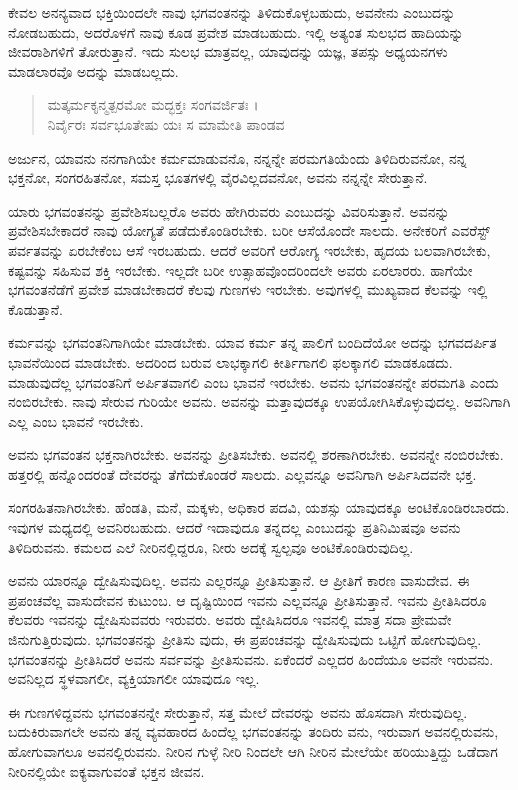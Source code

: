 ಕೇವಲ ಅನನ್ಯವಾದ ಭಕ್ತಿಯಿಂದಲೇ ನಾವು ಭಗವಂತನನ್ನು ತಿಳಿದುಕೊಳ್ಳಬಹುದು, ಅವನೇನು ಎಂಬುದನ್ನು ನೋಡಬಹುದು, ಅದರೊಳಗೆ ನಾವು ಕೂಡ ಪ್ರವೇಶ ಮಾಡಬಹುದು. ಇಲ್ಲಿ ಅತ್ಯಂತ ಸುಲಭದ ಹಾದಿಯನ್ನು ಜೀವರಾಶಿಗಳಿಗೆ ತೋರುತ್ತಾನೆ. ಇದು ಸುಲಭ ಮಾತ್ರವಲ್ಲ, ಯಾವುದನ್ನು ಯಜ್ಞ, ತಪಸ್ಸು ಅಧ್ಯಯನಗಳು ಮಾಡಲಾರವೊ ಅದನ್ನು ಮಾಡಬಲ್ಲದು.

\begin{verse}
ಮತ್ಕರ್ಮಕೃನ್ಮತ್ಪರಮೋ ಮದ್ಭಕ್ತಃ ಸಂಗವರ್ಜಿತಃ ।\\ನಿರ್ವೈರಃ ಸರ್ವಭೂತೇಷು ಯಃ ಸ ಮಾಮೇತಿ ಪಾಂಡವ 
\end{verse}

{\small ಅರ್ಜುನ, ಯಾವನು ನನಗಾಗಿಯೇ ಕರ್ಮಮಾಡುವನೊ, ನನ್ನನ್ನೇ ಪರಮಗತಿಯೆಂದು ತಿಳಿದಿರುವನೋ, ನನ್ನ ಭಕ್ತನೋ, ಸಂಗರಹಿತನೋ, ಸಮಸ್ತ ಭೂತಗಳಲ್ಲಿ ವೈರವಿಲ್ಲದವನೋ, ಅವನು ನನ್ನನ್ನೇ ಸೇರುತ್ತಾನೆ.}

ಯಾರು ಭಗವಂತನನ್ನು ಪ್ರವೇಶಿಸಬಲ್ಲರೊ ಅವರು ಹೇಗಿರುವರು ಎಂಬುದನ್ನು ವಿವರಿಸುತ್ತಾನೆ. ಅವನನ್ನು ಪ್ರವೇಶಿಸಬೇಕಾದರೆ ನಾವು ಯೋಗ್ಯತೆ ಪಡೆದುಕೊಂಡಿರಬೇಕು. ಬರೀ ಆಸೆಯೊಂದೇ ಸಾಲದು. ಅನೇಕರಿಗೆ ಎವರೆಸ್ಟ್ ಪರ್ವತವನ್ನು ಏರಬೇಕೆಂಬ ಆಸೆ ಇರಬಹುದು. ಆದರೆ ಅವರಿಗೆ ಆರೋಗ್ಯ ಇರಬೇಕು, ಹೃದಯ ಬಲವಾಗಿರಬೇಕು, ಕಷ್ಟವನ್ನು ಸಹಿಸುವ ಶಕ್ತಿ ಇರಬೇಕು. ಇಲ್ಲದೇ ಬರೀ ಉತ್ಸಾಹವೊಂದರಿಂದಲೇ ಅವರು ಏರಲಾರರು. ಹಾಗೆಯೇ ಭಗವಂತನೆಡೆಗೆ ಪ್ರವೇಶ ಮಾಡಬೇಕಾದರೆ ಕೆಲವು ಗುಣಗಳು ಇರಬೇಕು. ಅವುಗಳಲ್ಲಿ ಮುಖ್ಯವಾದ ಕೆಲವನ್ನು ಇಲ್ಲಿ ಕೊಡುತ್ತಾನೆ.

ಕರ್ಮವನ್ನು ಭಗವಂತನಿಗಾಗಿಯೇ ಮಾಡಬೇಕು. ಯಾವ ಕರ್ಮ ತನ್ನ ಪಾಲಿಗೆ ಬಂದಿದೆಯೋ ಅದನ್ನು ಭಗವದರ್ಪಿತ ಭಾವನೆಯಿಂದ ಮಾಡಬೇಕು. ಅದರಿಂದ ಬರುವ ಲಾಭಕ್ಕಾಗಲಿ ಕೀರ್ತಿಗಾಗಲಿ ಫಲಕ್ಕಾಗಲಿ ಮಾಡಕೂಡದು. ಮಾಡುವುದೆಲ್ಲ ಭಗವಂತನಿಗೆ ಅರ್ಪಿತವಾಗಲಿ ಎಂಬ ಭಾವನೆ ಇರಬೇಕು. ಅವನು ಭಗವಂತನನ್ನೇ ಪರಮಗತಿ ಎಂದು ನಂಬಿರಬೇಕು. ನಾವು ಸೇರುವ ಗುರಿಯೇ ಅವನು. ಅವನನ್ನು ಮತ್ತಾವುದಕ್ಕೂ ಉಪಯೋಗಿಸಿಕೊಳ್ಳುವುದಲ್ಲ. ಅವನಿಗಾಗಿ ಎಲ್ಲ ಎಂಬ ಭಾವನೆ ಇರಬೇಕು.

ಅವನು ಭಗವಂತನ ಭಕ್ತನಾಗಿರಬೇಕು. ಅವನನ್ನು ಪ್ರೀತಿಸಬೇಕು. ಅವನಲ್ಲಿ ಶರಣಾಗಿರಬೇಕು. ಅವನನ್ನೇ ನಂಬಿರಬೇಕು. ಹತ್ತರಲ್ಲಿ ಹನ್ನೊಂದರಂತೆ ದೇವರನ್ನು ತೆಗೆದುಕೊಂಡರೆ ಸಾಲದು. ಎಲ್ಲವನ್ನೂ ಅವನಿಗಾಗಿ ಅರ್ಪಿಸಿದವನೇ ಭಕ್ತ.

ಸಂಗರಹಿತನಾಗಿರಬೇಕು. ಹೆಂಡತಿ, ಮನೆ, ಮಕ್ಕಳು, ಅಧಿಕಾರ ಪದವಿ, ಯಶಸ್ಸು ಯಾವುದಕ್ಕೂ ಅಂಟಿಕೊಂಡಿರಬಾರದು. ಇವುಗಳ ಮಧ್ಯದಲ್ಲಿ ಅವನಿರಬಹುದು. ಆದರೆ ಇದಾವುದೂ ತನ್ನದಲ್ಲ ಎಂಬುದನ್ನು ಪ್ರತಿನಿಮಿಷವೂ ಅವನು ತಿಳಿದಿರುವನು. ಕಮಲದ ಎಲೆ ನೀರಿನಲ್ಲಿದ್ದರೂ, ನೀರು ಅದಕ್ಕೆ ಸ್ವಲ್ಪವೂ ಅಂಟಿಕೊಂಡಿರುವುದಿಲ್ಲ.

ಅವನು ಯಾರನ್ನೂ ದ್ವೇಷಿಸುವುದಿಲ್ಲ. ಅವನು ಎಲ್ಲರನ್ನೂ ಪ್ರೀತಿಸುತ್ತಾನೆ. ಆ ಪ್ರೀತಿಗೆ ಕಾರಣ ವಾಸುದೇವ. ಈ ಪ್ರಪಂಚವೆಲ್ಲ ವಾಸುದೇವನ ಕುಟುಂಬ. ಆ ದೃಷ್ಟಿಯಿಂದ ಇವನು ಎಲ್ಲವನ್ನೂ ಪ್ರೀತಿಸುತ್ತಾನೆ. ಇವನು ಪ್ರೀತಿಸಿದರೂ ಕೆಲವರು ಇವನನ್ನು ದ್ವೇಷಿಸುವವರು ಇರುವರು. ಅವರು ದ್ವೇಷಿಸಿದರೂ ಇವನಲ್ಲಿ ಮಾತ್ರ ಸದಾ ಪ್ರೇಮವೇ ಜಿನುಗುತ್ತಿರುವುದು. ಭಗವಂತನನ್ನು ಪ್ರೀತಿಸು ವುದು, ಈ ಪ್ರಪಂಚವನ್ನು ದ್ವೇಷಿಸುವುದು ಒಟ್ಟಿಗೆ ಹೋಗುವುದಿಲ್ಲ. ಭಗವಂತನನ್ನು ಪ್ರೀತಿಸಿದರೆ ಅವನು ಸರ್ವವನ್ನು ಪ್ರೀತಿಸುವನು. ಏಕೆಂದರೆ ಎಲ್ಲದರ ಹಿಂದೆಯೂ ಅವನೇ ಇರುವನು. ಅವನಿಲ್ಲದ ಸ್ಥಳವಾಗಲೀ, ವ್ಯಕ್ತಿಯಾಗಲೀ ಯಾವುದೂ ಇಲ್ಲ.

ಈ ಗುಣಗಳಿದ್ದವನು ಭಗವಂತನನ್ನೇ ಸೇರುತ್ತಾನೆ, ಸತ್ತ ಮೇಲೆ ದೇವರನ್ನು ಅವನು ಹೊಸದಾಗಿ ಸೇರುವುದಿಲ್ಲ. ಬದುಕಿರುವಾಗಲೇ ಅವನು ತನ್ನ ವ್ಯವಹಾರದ ಹಿಂದೆಲ್ಲ ಭಗವಂತನನ್ನು ತಂದಿರು ವನು, ಇರುವಾಗ ಅವನಲ್ಲಿರುವನು, ಹೋಗುವಾಗಲೂ ಅವನಲ್ಲಿರುವನು. ನೀರಿನ ಗುಳ್ಳೆ ನೀರಿ ನಿಂದಲೇ ಆಗಿ ನೀರಿನ ಮೇಲೆಯೇ ಹರಿಯುತ್ತಿದ್ದು ಒಡೆದಾಗ ನೀರಿನಲ್ಲಿಯೇ ಐಕ್ಯವಾಗುವಂತೆ ಭಕ್ತನ ಜೀವನ.

